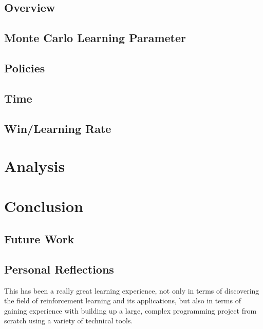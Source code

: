\documentclass[11pt,a4paper]{report}
\begin{document}
\section{Overview}


\section{Monte Carlo Learning Parameter}


\section{Policies} %


\section{Time}


\section{Win/Learning Rate}



\chapter{Analysis} %



\chapter{Conclusion}


\section{Future Work}


\section{Personal Reflections}

This has been a really great learning experience, not only in terms of discovering the field of reinforcement learning and its applications, but also in terms of gaining experience with building up a large, complex programming project from scratch using a variety of technical tools.
\end{document}
